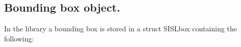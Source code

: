 

\subsection{Bounding box object.}

In the library a bounding box is stored in a struct SISLbox
containing the following:

\pgsbreak


